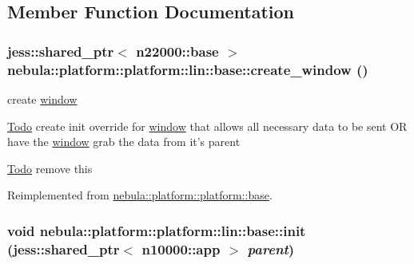 \subsection{Member Function Documentation}
\hypertarget{classnebula_1_1platform_1_1platform_1_1lin_1_1base_a2edb327fb68f9198ec048d9902dddb3b}{
\subsubsection[{create\_\-window}]{\setlength{\rightskip}{0pt plus 5cm}jess::shared\_\-ptr$<$ {\bf n22000::base} $>$ nebula::platform::platform::lin::base::create\_\-window ()}}
\label{classnebula_1_1platform_1_1platform_1_1lin_1_1base_a2edb327fb68f9198ec048d9902dddb3b}


create \hyperlink{namespacenebula_1_1platform_1_1window}{window} 

\begin{Desc}
\item[\hyperlink{todo__todo000007}{Todo}]create init override for \hyperlink{namespacenebula_1_1platform_1_1window}{window} that allows all necessary data to be sent OR have the \hyperlink{namespacenebula_1_1platform_1_1window}{window} grab the data from it's parent \end{Desc}


\begin{Desc}
\item[\hyperlink{todo__todo000008}{Todo}]remove this \end{Desc}


Reimplemented from \hyperlink{classnebula_1_1platform_1_1platform_1_1base_a3ea2aaff05ce1406a0fd0e72bdc7074c}{nebula::platform::platform::base}.\hypertarget{classnebula_1_1platform_1_1platform_1_1lin_1_1base_af6aec1ac7ee95afb45b83d110cd0c1f0}{
\subsubsection[{init}]{\setlength{\rightskip}{0pt plus 5cm}void nebula::platform::platform::lin::base::init (jess::shared\_\-ptr$<$ {\bf n10000::app} $>$ {\em parent})}}
\label{classnebula_1_1platform_1_1platform_1_1lin_1_1base_af6aec1ac7ee95afb45b83d110cd0c1f0}


